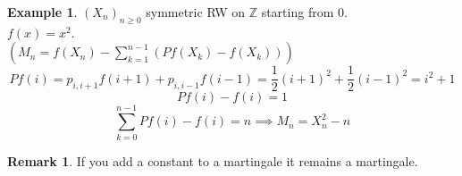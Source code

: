 \documentclass[10pt,a4paper]{article}
\theoremstyle{definition}
\newtheorem{exi}{Example}[section]
\newtheorem*{rem}{Remark}
\begin{document}
\begin{exi}
	$(X_n)_{n\geq0}$ symmetric RW on $\mathbb{Z}$ starting from $0$.\\
	$f(x)=x^2$.\\
	$\left(M_n=f(X_n)-\sum_{k=1}^{n-1}\left(Pf(X_k)-f(X_k)\right)\right)$
	\begin{equation*}
		Pf(i)=p_{i,i+1}f(i+1)+p_{i,i-1}f(i-1)=\frac{1}{2}(i+1)^2+\frac{1}{2}(i-1)^2=i^2+1
	\end{equation*}
\begin{equation*}
	Pf(i)-f(i)=1
\end{equation*}
\begin{equation*}
	\sum_{k=0}^{n-1}Pf(i)-f(i)=n \implies M_n=X_n^2-n
\end{equation*}
\end{exi}
\begin{rem}
	If you add a constant to a martingale it remains a martingale.
\end{rem}







\end{document}
